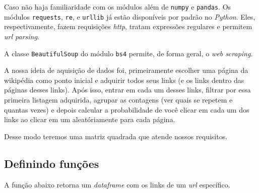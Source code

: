 \documentclass[11pt]{article}
\begin{document}
    Caso não haja familiaridade com os módulos além de \texttt{numpy} e
\texttt{pandas}. Os módulos \texttt{requests}, \texttt{re}, e
\texttt{urllib} já estão disponíveis por padrão no \emph{Python}. Eles,
respectivamente, fazem requisições \emph{http}, tratam expressões
regulares e permitem \emph{url parsing}.

A classe \texttt{BeautifulSoup} do módulo \texttt{bs4} permite, de forma
geral, o \emph{web scraping}.

A nossa ideia de aquisição de dados foi, primeiramente escolher uma
página da wikipédia como ponto inicial e adquirir todos seus links (e os
links dentro das páginas desses links). Após isso, entrar em cada um
desses links, filtrar por essa primeira listagem adquirida, agrupar as
contagens (ver quais se repetem e quantas vezes) e depois calcular a
probabilidade de você clicar em cada um dos links ao clicar em um
aleatóriamente para cada página.

Desse modo teremos uma matriz quadrada que atende nossos requisitos.

    \hypertarget{definindo-funuxe7uxf5es}{%
\subsection{Definindo funções}\label{definindo-funuxe7uxf5es}}

A função abaixo retorna um \emph{dataframe} com os links de um
\emph{url} específico.
\end{document}
